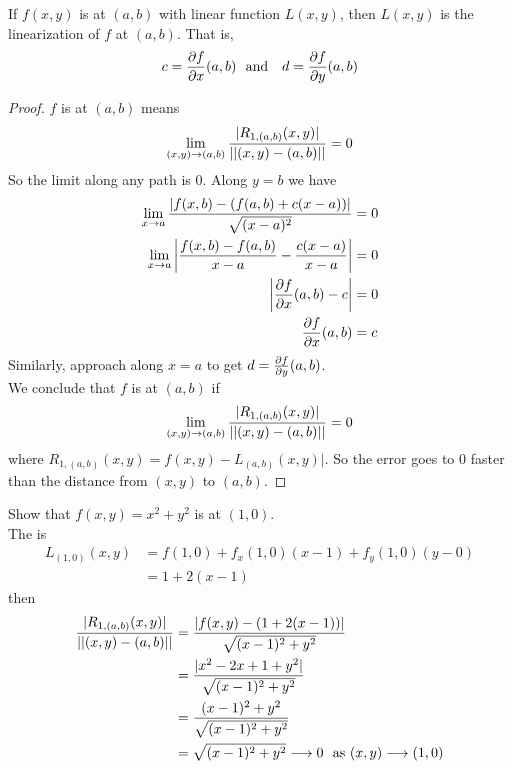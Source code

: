\documentclass[english, 11pt]{article}
\begin{document}
  \begin{thrm}
    If $f(x,y)$ is  at $(a,b)$ with linear function $L(x,y)$, then $L(x,y)$ is the linearization of $f$ at $(a,b)$. That is,
    \[ c = \frac{\partial f}{\partial x}(a,b) \mbox{\ \ and \ \ } d = \frac{\partial f}{\partial y}(a,b) \]
  \end{thrm}
  \begin{proof}
    $f$ is  at $(a,b)$ means
    \[ \lim_{(x,y) \rightarrow (a,b)}  \frac{|R_{1,(a,b)}(x,y)|}{||(x,y) - (a,b)||} = 0 \]
    So the limit along any path is 0. Along $y = b$ we have
    \begin{align*}
      \lim_{x \rightarrow a} \frac{|f(x,b) - (f(a,b) + c(x-a))|}{\sqrt{(x-a)^2}} & = 0\\
      \lim_{x \rightarrow a} \left| \frac{f(x,b) - f(a,b)}{x-a} - \frac{c(x-a)}{x-a} \right| & = 0 \\
      \left| \frac{\partial f}{\partial x} (a,b) - c \right| & = 0\\
      \frac{\partial f}{\partial x}(a,b) & = c
    \end{align*}
    Similarly, approach along $x = a$ to get $d = \frac{\partial f}{\partial y}(a,b)$. \\
    We conclude that $f$ is  at $(a,b)$ if
    \[ \lim_{(x,y) \rightarrow (a,b)} \frac{|R_{1,(a,b)}(x,y)|}{||(x,y) - (a,b)||} = 0 \]
    where $R_{1,(a,b)}(x,y) = f(x,y) - L_{(a,b)}(x,y)|$. So the error goes to 0 faster than the distance from $(x,y)$ to $(a,b)$.
  \end{proof}
  \begin{exmp}
    Show that $f(x,y) = x^2 + y^2$ is  at $(1,0)$. \\
    The  is
    \begin{align*}
      L_{(1,0)}(x,y) & = f(1,0) + f_x(1,0)(x-1) + f_y(1,0)(y-0) \\
                     & = 1 + 2(x-1)
    \end{align*}
    then
    \begin{align*}
      \frac{|R_{1,(a,b)}(x,y)|}{||(x,y) - (a,b)||} & = \frac{|f(x,y) - (1 + 2(x-1)) |}{\sqrt{(x-1)^2 + y^2}} \\
      & = \frac{|x^2 - 2x + 1 + y^2|}{\sqrt{(x-1)^2 + y^2}} \\
      & = \frac{(x-1)^2 + y^2}{\sqrt{(x-1)^2 + y^2}} \\
      & = \sqrt{(x-1)^2 + y^2} \longrightarrow 0 \mbox{ \ as $(x,y) \longrightarrow (1,0)$}
    \end{align*}
  \end{exmp}
\end{document}
